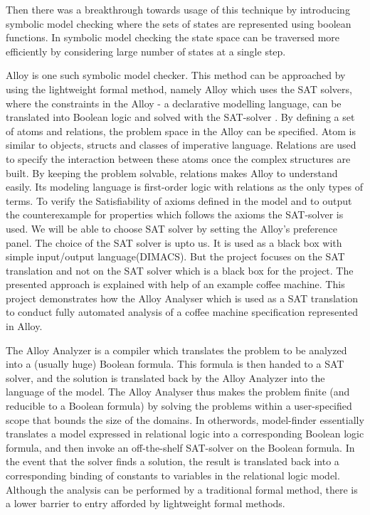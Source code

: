 \documentclass[a4paper,12pt]{report}
\begin{document}
\begin{onehalfspacing}
Then there was a breakthrough towards usage of this technique by introducing symbolic model checking where the sets of states are represented using boolean functions. In symbolic model checking the state space can be traversed more  efficiently by considering large number of states at a single step.
   
Alloy is one such symbolic model checker. This method can be approached by using the lightweight formal method, namely Alloy which uses the SAT solvers, where the constraints in the Alloy - a declarative modelling language, can be translated into Boolean logic and solved with the SAT-solver \cite{Yeung2005}. By defining a set of atoms and relations, the problem space in the Alloy can be specified. Atom is similar to objects, structs and classes of imperative language. Relations are used to specify the interaction between these atoms once the complex structures are built. By keeping the problem solvable, relations makes Alloy to understand easily. Its modeling language is first-order logic with relations as the only types of terms. To verify the Satisfiability of axioms defined in the model and to output the counterexample for properties which follows the axioms the SAT-solver is used. We will be able to choose SAT solver by setting the Alloy's preference panel. The choice of the SAT solver is upto us. It is used as a black box with simple input/output language(DIMACS). But the project focuses on the SAT translation and not on the  SAT solver which is a black box for the project. The presented approach is explained with help of an example coffee machine. This project demonstrates how the Alloy Analyser which is used as a SAT translation to conduct fully automated analysis of a coffee machine specification represented in Alloy. 

The Alloy Analyzer is a compiler which translates the problem to be analyzed into a (usually huge) Boolean formula. This formula is then handed to a SAT solver, and the solution is translated back by the Alloy Analyzer into the language of the model. The Alloy Analyser thus makes the problem finite (and reducible to a Boolean formula) by solving the problems within a user-specified scope that bounds the size of the domains. In otherwords, model-finder essentially translates a model expressed in relational logic into a corresponding Boolean logic formula, and then invoke an off-the-shelf SAT-solver on the Boolean formula. In the event that the solver finds a solution, the result is translated back into a corresponding binding of constants to variables in the relational logic model. Although the analysis can be performed by a traditional formal method, there is a lower barrier to entry afforded by lightweight formal methods.


\end{onehalfspacing}
\end{document}
